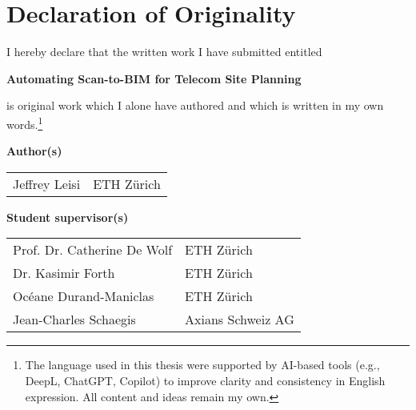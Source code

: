 \newlength{\oldparindent}
\setlength{\oldparindent}{\parindent}
\setlength{\parindent}{0pt}

\section*{Declaration of Originality}

\vspace{1cm}

I hereby declare that the written work I have submitted entitled

\vspace{0.5cm}

\textbf{Automating Scan-to-BIM for Telecom Site Planning}

\vspace{0.5cm}

is original work which I alone have authored and which is written in my own words.\footnote{The language used in this thesis were supported by AI-based tools (e.g., DeepL, ChatGPT, Copilot) to improve clarity and consistency in English expression. All content and ideas remain my own.}

\vspace{1cm}

\textbf{Author(s)}

\vspace{0.5cm}

\begin{tabular}{ p{5cm} p{5cm} }
  Jeffrey Leisi & ETH Zürich \\
\end{tabular}

\vspace{0.5cm}

\textbf{Student supervisor(s)}

\vspace{0.5cm}

\begin{tabular}{ p{5cm} p{5cm} }
  Prof. Dr. Catherine De Wolf & ETH Zürich \\
  Dr. Kasimir Forth & ETH Zürich \\
  Océane Durand-Maniclas & ETH Zürich \\
  Jean-Charles Schaegis & Axians Schweiz AG \\
\end{tabular}

\vspace{0.5cm}


